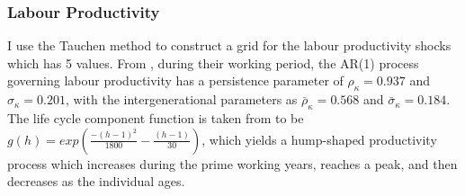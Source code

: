 \documentclass[12pt,a4paper]{article}
\begin{document}
%
%
%
%


%

\subsubsection*{ Labour Productivity}
\hspace*{6mm} I use the Tauchen method to construct a grid for the labour productivity shocks which has 5 values. From \cite{joe}, during their working period, the AR(1) process governing labour productivity has a persistence parameter of $\rho_\kappa=0.937$ and $\sigma_{\kappa}=0.201$, with the intergenerational parameters as  $\bar{\rho}_{\kappa}=0.568$ and $\bar{\sigma}_{\kappa}=0.184$. The life cycle component function is taken from \cite{GETAL} to be $g(h) = exp \left( \frac{-(h-1)^2}{1800}-\frac{(h-1)}{30} \right)$, which yields a hump-shaped productivity process which increases during the prime working years, reaches a peak, and then decreases as the individual ages.
 
\end{document}
